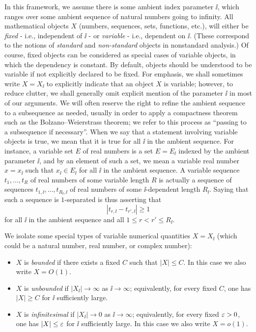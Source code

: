 In this framework, we assume there is some ambient index parameter $\ii$, which ranges over some ambient sequence of natural numbers going to infinity.  All mathematical objects $X$ (numbers, sequences, sets, functions, etc.), will either be \emph{fixed} - i.e., independent of $\ii$ - or \emph{variable} - i.e., dependent on $\ii$.  (These correspond to the notions of \emph{standard} and \emph{non-standard} objects in nonstandard analysis.)  Of course, fixed objects can be considered as special cases of variable objects, in which the dependency is constant.  By default, objects should be understood to be variable if not explicitly declared to be fixed. For emphasis, we shall sometimes write $X = X_{\ii}$ to explicitly indicate that an object $X$ is variable; however, to reduce clutter, we shall generally omit explicit mention of the parameter $\ii$ in most of our arguments. We will often reserve the right to refine the ambient sequence to a subsequence as needed, usually in order to apply a compactness theorem such as the Bolzano--Weierstrass theorem; we refer to this process as ``passing to a subsequence if necessary''.  When we say that a statement involving variable objects is true, we mean that it is true for all $\ii$ in the ambient sequence.
For instance, a variable set $E$ of real numbers is a set $E = E_{\ii}$ indexed by the ambient parameter $\ii$, and by an element of such a set, we mean a variable real number $x = x_{\ii}$ such that $x_{\ii} \in E_{\ii}$ for all $\ii$ in the ambient sequence.  A variable sequence $t_1,\dots,t_R$ of real numbers of some variable length $R$ is actually a sequence of sequences $t_{1,\ii},\dots,t_{R_{\ii}, \ii}$ of real numbers of some $\ii$-dependent length $R_{\ii}$.  Saying that such a sequence is $1$-separated is thus asserting that
$$ |t_{r, \ii} - t_{r', \ii}| \geq 1$$
for all $\ii$ in the ambient sequence and all $1 \leq r < r' \leq R_{\ii}$.

We isolate some special types of variable numerical quantities $X = X_{\ii}$ (which could be a natural number, real number, or complex number):
\begin{itemize}
\item $X$ is \emph{bounded} if there exists a fixed $C$ such that $|X| \leq C$. In this case we also write $X = O(1)$.
\item $X$ is \emph{unbounded} if $|X_{\ii}| \to \infty$ as $\ii \to \infty$; equivalently, for every fixed $C$, one has $|X| \geq C$ for $\ii$ sufficiently large.
\item $X$ is \emph{infinitesimal} if $|X_{\ii}| \to 0$ as $\ii \to \infty$; equivalently, for every fixed $\varepsilon>0$, one has $|X| \leq \varepsilon$ for $\ii$ sufficiently large. In this case we also write $X = o(1)$.
\end{itemize}


